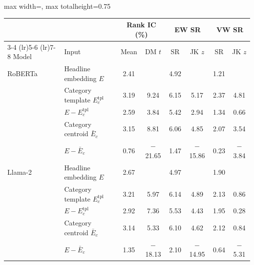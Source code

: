 \begin{table}[htbp]
{\footnotesize
\begin{adjustbox}{max width=\linewidth, max totalheight=0.75\textheight}
\begin{tabular}{llcccccc}
\toprule
\multicolumn{2}{c}{} & \multicolumn{2}{c}{Rank IC (\%)} & \multicolumn{2}{c}{EW SR} & \multicolumn{2}{c}{VW SR} \\
\cmidrule(lr){3-4} \cmidrule(lr){5-6} \cmidrule(lr){7-8}
Model & Input & Mean & DM $t$ & SR & JK $z$ & SR & JK $z$ \\
\midrule
RoBERTa & Headline embedding $E$ & 2.41 &  & 4.92 &  & 1.21 &  \\
 & Category template $E^{\mathrm{tpl}}_c$ & 3.19 & \phantom{$-$0}9.24 & 6.15 & \phantom{$-$0}5.17 & 2.37 & \phantom{$-$}4.81 \\
 & $E-E^{\mathrm{tpl}}_c$ & 2.59 & \phantom{$-$0}3.84 & 5.42 & \phantom{$-$0}2.94 & 1.34 & \phantom{$-$}0.66 \\
 & Category centroid $\bar E_c$ & 3.15 & \phantom{$-$0}8.81 & 6.06 & \phantom{$-$0}4.85 & 2.07 & \phantom{$-$}3.54 \\
 & $E-\bar E_c$ & 0.76 & $-$21.65 & 1.47 & $-$15.86 & 0.23 & $-$3.84 \\
\midrule
Llama-2 & Headline embedding $E$ & 2.67 &  & 4.97 &  & 1.90 &  \\
 & Category template $E^{\mathrm{tpl}}_c$ & 3.21 & \phantom{$-$0}5.97 & 6.14 & \phantom{$-$0}4.89 & 2.13 & \phantom{$-$}0.86 \\
 & $E-E^{\mathrm{tpl}}_c$ & 2.92 & \phantom{$-$0}7.36 & 5.53 & \phantom{$-$0}4.43 & 1.95 & \phantom{$-$}0.28 \\
 & Category centroid $\bar E_c$ & 3.14 & \phantom{$-$0}5.33 & 6.10 & \phantom{$-$0}4.62 & 2.12 & \phantom{$-$}0.84 \\
 & $E-\bar E_c$ & 1.35 & $-$18.13 & 2.10 & $-$14.95 & 0.64 & $-$5.31 \\
\bottomrule
\end{tabular}
\end{adjustbox}
}
\end{table}
